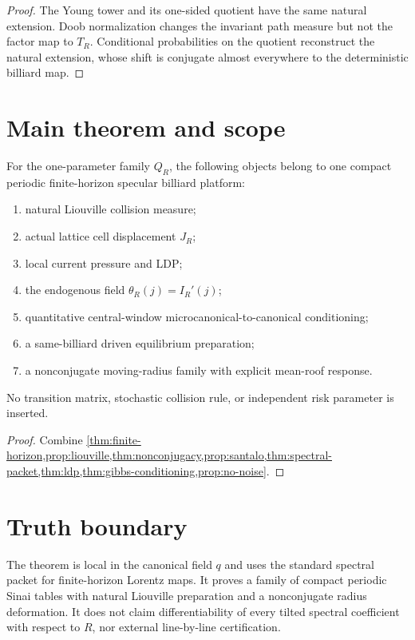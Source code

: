 \begin{proof}
The Young tower and its one-sided quotient have the same natural extension.
Doob normalization changes the invariant path measure but not the factor map
to $T_R$.  Conditional probabilities on the quotient reconstruct the natural
extension, whose shift is conjugate almost everywhere to the deterministic
billiard map.
\end{proof}

\section{Main theorem and scope}\label{sec:main}
\begin{theorem}\label{thm:main}
For the one-parameter family $Q_R$, the following objects belong to one compact
periodic finite-horizon specular billiard platform:
\begin{enumerate}[label=(\roman*)]
\item natural Liouville collision measure;
\item actual lattice cell displacement $J_R$;
\item local current pressure and LDP;
\item the endogenous field $\theta_R(j)=I_R'(j)$;
\item quantitative central-window microcanonical-to-canonical conditioning;
\item a same-billiard driven equilibrium preparation;
\item a nonconjugate moving-radius family with explicit mean-roof response.
\end{enumerate}
No transition matrix, stochastic collision rule, or independent risk parameter
is inserted.
\end{theorem}
\begin{proof}
Combine \cref{thm:finite-horizon,prop:liouville,thm:nonconjugacy,prop:santalo,thm:spectral-packet,thm:ldp,thm:gibbs-conditioning,prop:no-noise}.
\end{proof}

\section*{Truth boundary}
The theorem is local in the canonical field $q$ and uses the standard spectral
packet for finite-horizon Lorentz maps.  It proves a family of compact periodic
Sinai tables with natural Liouville preparation and a nonconjugate radius
deformation.  It does not claim differentiability of every tilted spectral
coefficient with respect to $R$, nor external line-by-line certification.
\printbibliography

